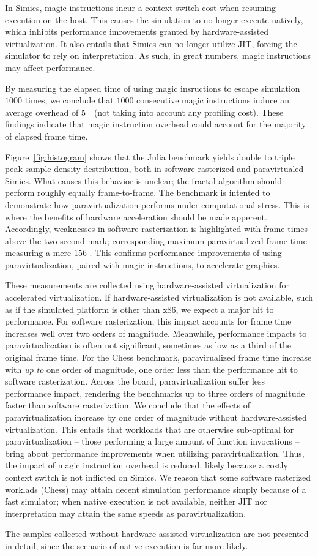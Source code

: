 In Simics, magic instructions incur a context switch cost when resuming execution on the host.
This causes the simulation to no longer execute natively, which inhibits performance imrovements granted by hardware-assisted virtualization.
It also entails that Simics can no longer utilize JIT, forcing the simulator to rely on interpretation.
As such, in great numbers, magic instructions may affect performance.

By measuring the elapsed time of using magic insructions to escape simulation $1000$ times, we conclude that $1000$ consecutive magic instructions induce an average overhead of $5$~\milli\second\ (not taking into account any profiling cost).
These findings indicate that magic instruction overhead could account for the majority of elapsed frame time.

Figure~\ref{fig:histogram} shows that the Julia benchmark yields double to triple peak sample density destribution, both in software rasterized and paravirtualed Simics.
What causes this behavior is unclear; the fractal algorithm should perform roughly equally frame-to-frame.
The benchmark is intented to demonstrate how paravirtualization performs under computational stress.
This is where the benefits of hardware acceleration should be made apperent.
Accordingly, weaknesses in software rasterization is highlighted with frame times above the two second mark; corresponding maximum paravirtualized frame time measuring a mere $156$ \milli\second.
This confirms performance improvements of using paravirtualization, paired with magic instructions, to accelerate graphics.

These measurements are collected using hardware-assisted virtualization for accelerated virtualization.
If hardware-assisted virtualization is not available, such as if the simulated platform is other than x86, we expect a major hit to performance.
For software rasterization, this impact accounts for frame time increases well over two orders of magnitude.
Meanwhile, performance impacts to paravirtualization is often not significant, sometimes as low as a third of the original frame time.
For the Chess benchmark, paravirualized frame time increase with \textit{up to} one order of magnitude, one order less than the performance hit to software rasterization.
Across the board, paravirtualization suffer less performance impact, rendering the benchmarks up to three orders of magnitude faster than software rasterization.
We conclude that the effects of paravirtualization increase by one order of magnitude without hardware-assisted virtualization.
This entails that workloads that are otherwise sub-optimal for paravirtualization -- those performing a large amount of function invocations -- bring about performance improvements when utilizing paravirtualization.
Thus, the impact of magic instruction overhead is reduced, likely because a costly context switch is not inflicted on Simics.
We reason that some software rasterized worklads (Chess) may attain decent simulation performance simply because of a fast simulator; when native execution is not available, neither JIT nor interpretation may attain the same speeds as paravirtualization.

The samples collected without hardware-assisted virtualization are not presented in detail, since the scenario of native execution is far more likely.
